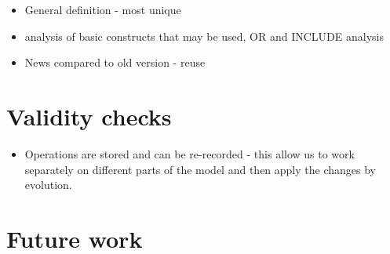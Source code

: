 \begin{itemize}
    \item General definition - most unique
    \item analysis of basic constructs that may be used, OR and INCLUDE analysis
    \item News compared to old version - reuse
\end{itemize}

\chapter{Validity checks}

\begin{itemize}
    \item Operations are stored and can be re-recorded - this allow us to work separately on different parts of the model and then apply the changes by evolution.
\end{itemize}

\chapter{Future work}



